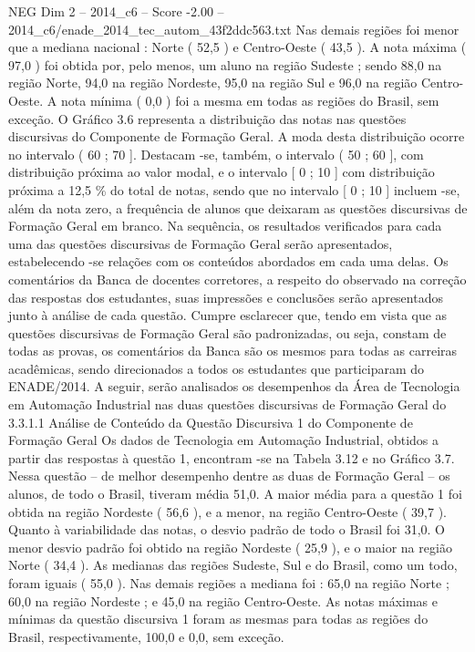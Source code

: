 \begin{textsample}{NEG Dim 2 – 2014\_c6 – Score -2.00 – 2014\_c6/enade\_2014\_tec\_autom\_43f2ddc563.txt}
Nas demais regiões foi menor que a mediana nacional : Norte ( 52,5 ) e Centro-Oeste ( 43,5 ).
A nota máxima ( 97,0 ) foi obtida por, pelo menos, um aluno na região Sudeste ; sendo 88,0 na região Norte, 94,0 na região Nordeste, 95,0 na região Sul e 96,0 na região Centro-Oeste.
A nota mínima ( 0,0 ) foi a mesma em todas as regiões do Brasil, sem exceção.
O Gráfico 3.6 representa a distribuição das notas nas questões discursivas do Componente de Formação Geral.
A moda desta distribuição ocorre no intervalo ( 60 ; 70 ].
Destacam -se, também, o intervalo ( 50 ; 60 ], com distribuição próxima ao valor modal, e o intervalo [ 0 ; 10 ] com distribuição próxima a 12,5 \% do total de notas, sendo que no intervalo [ 0 ; 10 ] incluem -se, além da nota zero, a frequência de alunos que deixaram as questões discursivas de Formação Geral em branco.
Na sequência, os resultados verificados para cada uma das questões discursivas de Formação Geral serão apresentados, estabelecendo -se relações com os conteúdos abordados em cada uma delas.
Os comentários da Banca de docentes corretores, a respeito do observado na correção das respostas dos estudantes, suas impressões e conclusões serão apresentados junto à análise de cada questão.
Cumpre esclarecer que, tendo em vista que as questões discursivas de Formação Geral são padronizadas, ou seja, constam de todas as provas, os comentários da Banca são os mesmos para todas as carreiras acadêmicas, sendo direcionados a todos os estudantes que participaram do ENADE/2014.
A seguir, serão analisados os desempenhos da Área de Tecnologia em Automação Industrial nas duas questões discursivas de Formação Geral do 3.3.1.1 Análise de Conteúdo da Questão Discursiva 1 do Componente de Formação Geral Os dados de Tecnologia em Automação Industrial, obtidos a partir das respostas à questão 1, encontram -se na Tabela 3.12 e no Gráfico 3.7.
Nessa questão – de melhor desempenho dentre as duas de Formação Geral – os alunos, de todo o Brasil, tiveram média 51,0.
A maior média para a questão 1 foi obtida na região Nordeste ( 56,6 ), e a menor, na região Centro-Oeste ( 39,7 ).
Quanto à variabilidade das notas, o desvio padrão de todo o Brasil foi 31,0.
O menor desvio padrão foi obtido na região Nordeste ( 25,9 ), e o maior na região Norte ( 34,4 ).
As medianas das regiões Sudeste, Sul e do Brasil, como um todo, foram iguais ( 55,0 ).
Nas demais regiões a mediana foi : 65,0 na região Norte ; 60,0 na região Nordeste ; e 45,0 na região Centro-Oeste.
As notas máximas e mínimas da questão discursiva 1 foram as mesmas para todas as regiões do Brasil, respectivamente, 100,0 e 0,0, sem exceção.

\end{textsample}
